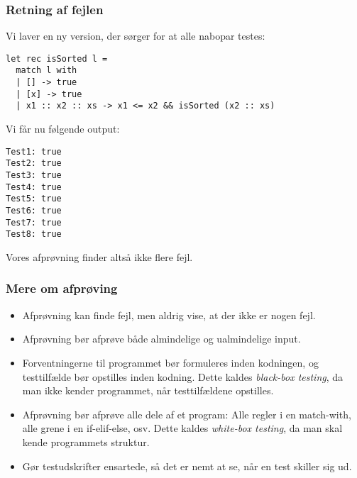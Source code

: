\documentclass{beamer}
\begin{document}
\begin{frame}[fragile=singleslide]
\frametitle{Retning af fejlen}

Vi laver en ny version, der sørger for at alle nabopar testes:

\begin{verbatim}
let rec isSorted l =
  match l with
  | [] -> true
  | [x] -> true
  | x1 :: x2 :: xs -> x1 <= x2 && isSorted (x2 :: xs)
\end{verbatim}

Vi får nu følgende output:

{\small
\begin{verbatim}
Test1: true
Test2: true
Test3: true
Test4: true
Test5: true
Test6: true
Test7: true
Test8: true
\end{verbatim}
}

Vores afprøvning finder altså ikke flere fejl.

\end{frame}

\begin{frame}
\frametitle{Mere om afprøving}

\begin{itemize}
\item Afprøvning kan finde fejl, men aldrig vise, at der ikke er nogen
  fejl.
\item Afprøvning bør afprøve både almindelige og ualmindelige input.
\item Forventningerne til programmet bør formuleres inden kodningen,
  og testtilfælde bør opstilles inden kodning.  Dette kaldes
  \emph{black-box testing}, da man ikke kender programmet, når
  testtilfældene opstilles.
\item Afprøvning bør afprøve alle dele af et program: Alle regler i en
  match-with, alle grene i en if-elif-else, osv.  Dette kaldes
  \emph{white-box testing}, da man skal kende programmets struktur.
\item Gør testudskrifter ensartede, så det er nemt at se, når en test
  skiller sig ud.
\end{itemize}

\end{frame}
\end{document}
